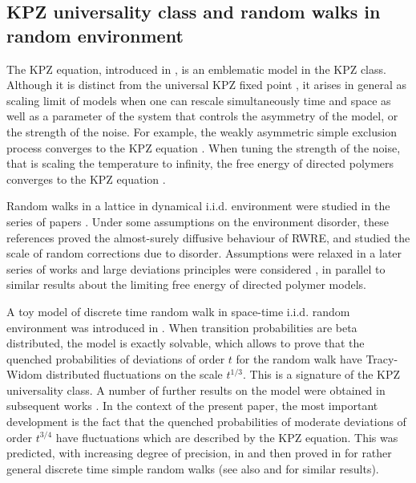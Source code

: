 \documentclass[a4paper,11pt,oneside,reqno]{amsart}
\theoremstyle{definition}
\numberwithin{equation}{section}
\begin{document}
\subsection*{KPZ universality class and random walks in random environment} 

 The KPZ equation,  introduced in \cite{KPZ-original}, is an emblematic model in the KPZ class. Although it  is distinct from the universal KPZ fixed point \cite{matetski2021kpz}, it arises in general as scaling limit of models when one can rescale simultaneously time and space as well as a parameter of the system that controls the asymmetry of the model, or the strength of the noise. For example, the weakly asymmetric simple exclusion process converges to the KPZ equation \cite{bertini1997stochastic}. When tuning the strength of the noise, that is scaling the temperature to infinity, the free energy of directed polymers converges to the KPZ equation \cite{alberts2014intermediate}. 


\medskip 
{\color{black}Random walks in a lattice in dynamical i.i.d. environment were studied in the series of papers \cite{BoldrighiniIgnatyukMalyshevPellegrinotti1992, BoldrighiniMinlosPellegrinotti1997,BernabeiBoldrighiniMinlosPellegrinotti1998, boldrighini1999central, boldrighini2001t, bernabei2001anomalous, boldrighini2004random}. Under some assumptions on the environment disorder, these references proved the almost-surely diffusive behaviour of RWRE, and studied  the scale of random corrections due to disorder. Assumptions were relaxed in a later series of works \cite{berard2004almost, rassoulagha2005almost, balazs2006random, rassoulagha2009almost} and large deviations principles were considered \cite{rassoulagha2013quenched}, in parallel to similar results about the limiting free energy of directed polymer models.} 


 
 \medskip 
 A toy model of discrete time random walk in space-time i.i.d. random environment was introduced in \cite{barraquand2015}. When transition probabilities are beta distributed, the model is exactly solvable, which allows to prove that the quenched probabilities of  deviations of order $t$ for the random walk have Tracy-Widom distributed fluctuations on the scale $t^{1/3}$.  This is a signature of the KPZ universality class. A number of further results on the model were obtained in subsequent works \cite{thiery2015integrable, thiery2016exact, corwin2017kardar,balazs2018large,  barraquand2020large, barraquand2022, hass2023anomalous, hass2024extreme,hass2024first}.
  In the context of the present paper, the most important development is the fact that the quenched probabilities of moderate deviations of order $t^{3/4}$ have fluctuations which are described by the KPZ equation. This was predicted, with increasing degree of precision, in \cite{thiery2016exact, leDoussal-17, B-LD-moderate} and then proved in \cite{das2024multiplicative} for rather general discrete time simple random walks (see also \cite{das2024kpz} and  \cite{brockington2022edge} for similar results). 
 
\end{document}
